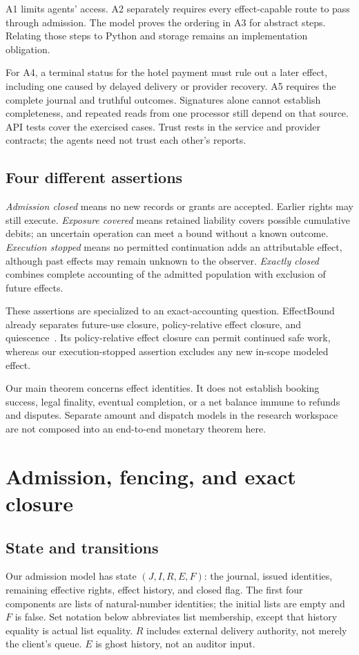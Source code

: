 \documentclass[letterpaper]{article}
\begin{document}
A1 limits agents' access. A2 separately requires every effect-capable route to
pass through admission. The model proves the ordering in A3 for abstract steps. Relating those steps to Python and storage remains an implementation
obligation.

For A4, a terminal status for the hotel payment must rule out a later effect,
including one caused by delayed delivery or provider recovery. A5 requires the
complete journal and truthful outcomes. Signatures alone cannot establish
completeness, and repeated reads from one processor still depend on that source.
API tests cover the exercised cases. Trust rests in the service and provider
contracts; the agents need not trust each other's reports.



\subsection{Four different assertions}
\emph{Admission closed} means no new records or grants are accepted. Earlier
rights may still execute. \emph{Exposure covered} means retained liability
covers possible cumulative debits; an uncertain operation can meet a bound
without a known outcome. \emph{Execution stopped} means no permitted
continuation adds an attributable effect, although past effects may remain
unknown to the observer. \emph{Exactly closed} combines complete accounting
of the admitted population with exclusion of future effects.

These assertions are specialized to an exact-accounting question. EffectBound
already separates future-use closure, policy-relative effect closure, and
quiescence~\citep{effectbound}. Its policy-relative effect closure can permit
continued safe work, whereas our execution-stopped assertion excludes any new
in-scope modeled effect.

Our main theorem concerns effect identities. It does not establish booking
success, legal finality, eventual completion, or a net balance immune to refunds
and disputes. Separate amount and dispatch models in the research workspace
are not composed into an end-to-end monetary theorem here.



\section{Admission, fencing, and exact closure}
\label{sec:theorem}
\subsection{State and transitions}
Our admission model has state $(J,I,R,E,F)$: the journal, issued identities, remaining
effective rights, effect history, and closed flag. The first four components
are lists of natural-number identities; the initial lists are empty and $F$ is
false. Set notation below abbreviates list membership, except that history
equality is actual list equality. $R$ includes external delivery authority,
not merely the client's queue. $E$ is ghost history, not an auditor input.
\end{document}
